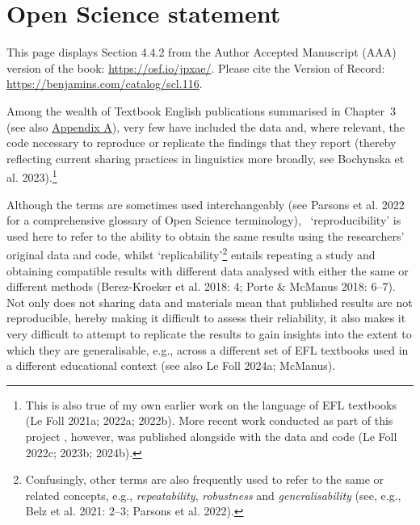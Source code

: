 \documentclass[
  letterpaper,
  DIV=11,
  numbers=noendperiod]{scrreprt}
\begin{document}

\chapter{Open Science statement}\label{open-science-statement}

\begin{tcolorbox}[enhanced jigsaw, bottomtitle=1mm, colframe=quarto-callout-note-color-frame, title=\textcolor{quarto-callout-note-color}{\faInfo}\hspace{0.5em}{Note}, colback=white, coltitle=black, colbacktitle=quarto-callout-note-color!10!white, titlerule=0mm, toprule=.15mm, bottomrule=.15mm, breakable, arc=.35mm, left=2mm, rightrule=.15mm, toptitle=1mm, opacityback=0, leftrule=.75mm, opacitybacktitle=0.6]

This page displays Section 4.4.2 from the Author Accepted Manuscript
(AAA) version of the book: \url{https://osf.io/jpxae/}. Please cite the
Version of Record: \url{https://benjamins.com/catalog/scl.116}.

\end{tcolorbox}

Among the wealth of Textbook English publications summarised in
Chapter~3 (see also
\href{https://elenlefoll.github.io/TextbookMDA/AppendixA.html}{Appendix
A}), very few have included the data and, where relevant, the code
necessary to reproduce or replicate the findings that they report
(thereby reflecting current sharing practices in linguistics more
broadly, see Bochynska et al. 2023).\footnote{This is also true of my
  own earlier work on the language of EFL textbooks (Le Foll 2021a;
  2022a; 2022b). More recent work conducted as part of this project ,
  however, was published alongside with the data and code (Le Foll
  2022c; 2023b; 2024b).}

Although the terms are sometimes used interchangeably (see Parsons et
al. 2022 for a comprehensive glossary of Open Science terminology),
~`reproducibility' is used here to refer to the ability to obtain the
same results using the researchers' original data and code, whilst
`replicability'\footnote{Confusingly, other terms are also frequently
  used to refer to the same or related concepts, e.g.,
  \emph{repeatability}, \emph{robustness} and \emph{generalisability}
  (see, e.g., Belz et al. 2021: 2--3; Parsons et al. 2022).} entails
repeating a study and obtaining compatible results with different data
analysed with either the same or different methods (Berez-Kroeker et al.
2018: 4; Porte \& McManus 2018: 6--7). Not only does not sharing data
and materials mean that published results are not reproducible, hereby
making it difficult to assess their reliability, it also makes it very
difficult to attempt to replicate the results to gain insights into the
extent to which they are generalisable, e.g., across a different set of
EFL textbooks used in a different educational context (see also Le Foll
2024a; McManus).
\end{document}
